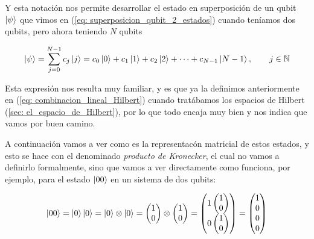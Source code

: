 \documentclass{article}
\numberwithin{equation}{section} %
\begin{document}
    Y esta notación nos permite desarrollar el estado en superposición de un qubit \( \ket{\psi} \) que vimos en (\ref{eq: superposicion_qubit_2_estados}) cuando teníamos dos qubits, pero ahora teniendo \( N \) qubits

    \begin{equation}
        \ket{\psi} = \sum_{j = 0}^{N - 1} c_{j} \ket{j} = c_{0} \ket{0} + c_{1} \ket{1} + c_{2} \ket{2} + \cdots + c_{N - 1} \ket{N - 1}, \qquad j \in \mathbb{N} 
        \label{eq: estado_qubit_dimension_N}
    \end{equation}

    \vspace{2.5mm}

    Esta expresión nos resulta muy familiar, y es que ya la definimos anteriormente en (\ref{eq: combinacion_lineal_Hilbert}) cuando tratábamos los espacios de Hilbert (\ref{sec: el_espacio_de_Hilbert}), por lo que todo encaja muy bien y nos indica que vamos por buen camino. 

    \vspace{5mm}

    A continuación vamos a ver como es la representacón matricial de estos estados, y esto se hace con el denominado \textit{producto de Kronecker}, el cual no vamos a definirlo formalmente, sino que vamos a ver directamente como funciona, por ejemplo, para el estado \( \ket{0 0} \) en un sistema de dos qubits:

    \begin{equation*}
        \ket{0 0} = \ket{0} \ket{0} = \ket{0} \otimes \ket{0} = \begin{pmatrix}
            1 \\
            0
        \end{pmatrix} \otimes \begin{pmatrix}
            1 \\
            0
        \end{pmatrix} = \begin{pmatrix}
            1 \begin{pmatrix} 1 \\ 0 \end{pmatrix} \\
            0 \begin{pmatrix} 1 \\ 0 \end{pmatrix}
        \end{pmatrix} = \begin{pmatrix}
            1 \\
            0 \\
            0 \\
            0
        \end{pmatrix}
    \end{equation*}
\end{document}
